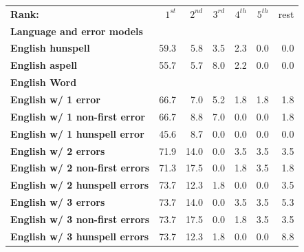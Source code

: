 \documentclass[a4paper,12pt]{article}
\begin{document}
\begin{table}
    \centering
    \begin{tabular}{|l|r|r|r|r|r|r|}
        \hline
        \bf Rank: & $1^{st}$ & $2^{nd}$ & $3^{rd}$ & $4^{th}$ & $5^{th}$ & rest \\
        \bf Language and error models &   &  &  &  &  &  \\
        \hline
        \bf English hunspell & 59.3 & 5.8 & 3.5 & 2.3 & 0.0 & 0.0 \\
          \bf English aspell & 55.7 & 5.7 & 8.0 & 2.2 & 0.0 & 0.0 \\
            \bf English Word & & & & & &  \\
        \hline
        \bf English w/ 1 error     & 66.7 & 7.0  & 5.2 & 1.8 & 1.8 & 1.8 \\
 \bf English w/ 1 non-first error  & 66.7 & 8.8  & 7.0 & 0.0 & 0.0 & 1.8 \\
 \bf English w/ 1 hunspell error   & 45.6 & 8.7  & 0.0 & 0.0 & 0.0 & 0.0 \\
     \bf English w/ 2 errors       & 71.9 & 14.0 & 0.0 & 3.5 & 3.5 & 3.5 \\
 \bf English w/ 2 non-first errors & 71.3 & 17.5 & 0.0 & 1.8 & 3.5 & 1.8 \\
 \bf English w/ 2 hunspell errors  & 73.7 & 12.3 & 1.8 & 0.0 & 0.0 & 3.5 \\
   \bf English w/ 3 errors         & 73.7 & 14.0 & 0.0 & 3.5 & 3.5 & 5.3 \\
 \bf English w/ 3 non-first errors & 73.7 & 17.5 & 0.0 & 1.8 & 3.5 & 3.5 \\
 \bf English w/ 3 hunspell errors  & 73.7 & 12.3 & 1.8 & 0.0 & 0.0 & 8.8 \\
        \hline

\end{tabular}
\end{table}
\end{document}
